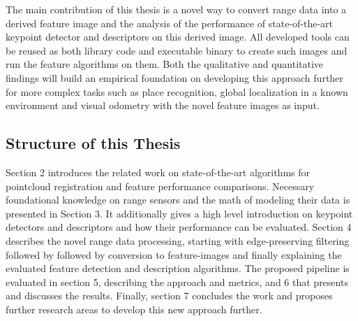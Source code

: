 The main contribution of this thesis is a novel way to convert range data into a derived feature image and the analysis of the performance of state-of-the-art keypoint detector and descriptors on this derived image.
All developed tools can be reused as both library code and executable binary to create such images and run the feature algorithms on them.
Both the qualitative and quantitative findings will build an empirical foundation on developing this approach further for more complex tasks such as place recognition, global localization in a known environment and visual odometry with the novel feature images as input.

\subsection{Structure of this Thesis}

Section 2 introduces the related work on state-of-the-art algorithms for pointcloud registration and feature performance comparisons.
Necessary foundational knowledge on range sensors and the math of modeling their data is presented in Section 3.
It additionally gives a high level introduction on keypoint detectors and descriptors and how their performance can be evaluated.
Section 4 describes the novel range data processing, starting with edge-preserving filtering followed by followed by conversion to feature-images and finally explaining the evaluated feature detection and description algorithms.
The proposed pipeline is evaluated in section 5, describing the approach and metrics, and 6 that presents and discusses the results.
Finally, section 7 concludes the work and proposes further research areas to develop this new approach further.
